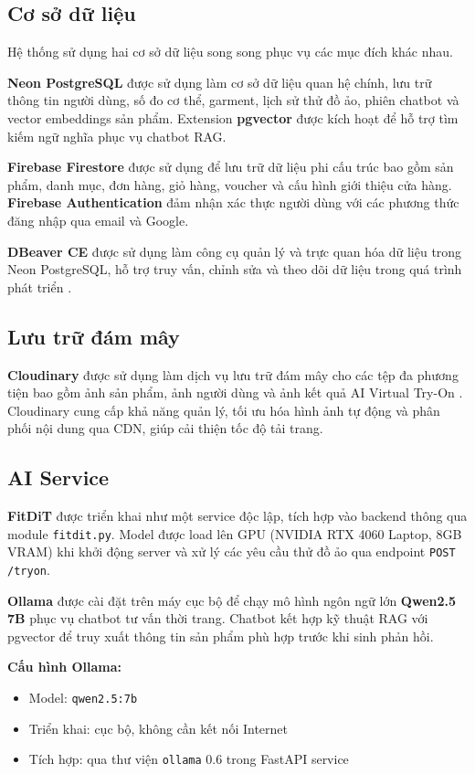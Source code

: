 \subsection{Cơ sở dữ liệu}
Hệ thống sử dụng hai cơ sở dữ liệu song song phục vụ các mục 
đích khác nhau.

\textbf{Neon PostgreSQL} được sử dụng làm cơ sở dữ liệu quan hệ 
chính, lưu trữ thông tin người dùng, số đo cơ thể, garment, 
lịch sử thử đồ ảo, phiên chatbot và vector embeddings sản phẩm. 
Extension \textbf{pgvector} được kích hoạt để hỗ trợ tìm kiếm 
ngữ nghĩa phục vụ chatbot RAG.

\textbf{Firebase Firestore} được sử dụng để lưu trữ dữ liệu 
phi cấu trúc bao gồm sản phẩm, danh mục, đơn hàng, giỏ hàng, 
voucher và cấu hình giới thiệu cửa hàng. \textbf{Firebase 
Authentication} đảm nhận xác thực người dùng với các phương thức 
đăng nhập qua email và Google.

\textbf{DBeaver CE} được sử dụng làm công cụ quản lý và trực 
quan hóa dữ liệu trong Neon PostgreSQL, hỗ trợ truy vấn, 
chỉnh sửa và theo dõi dữ liệu trong quá trình phát triển 
\cite{dbeaver_docs}.

\subsection{Lưu trữ đám mây}
\textbf{Cloudinary} được sử dụng làm dịch vụ lưu trữ đám mây 
cho các tệp đa phương tiện bao gồm ảnh sản phẩm, ảnh người dùng 
và ảnh kết quả AI Virtual Try-On \cite{cloudinary_docs}. 
Cloudinary cung cấp khả năng quản lý, tối ưu hóa hình ảnh 
tự động và phân phối nội dung qua CDN, giúp cải thiện tốc độ 
tải trang.

\subsection{AI Service}
\textbf{FitDiT} được triển khai như một service độc lập, tích 
hợp vào backend thông qua module \texttt{fitdit.py}. Model được 
load lên GPU (NVIDIA RTX 4060 Laptop, 8GB VRAM) khi khởi động 
server và xử lý các yêu cầu thử đồ ảo qua endpoint 
\texttt{POST /tryon}.

\textbf{Ollama} được cài đặt trên máy cục bộ để chạy mô hình 
ngôn ngữ lớn \textbf{Qwen2.5 7B} phục vụ chatbot tư vấn thời 
trang. Chatbot kết hợp kỹ thuật RAG với pgvector để truy xuất 
thông tin sản phẩm phù hợp trước khi sinh phản hồi.

\textbf{Cấu hình Ollama:}
\begin{itemize}[noitemsep]
    \item Model: \texttt{qwen2.5:7b}
    \item Triển khai: cục bộ, không cần kết nối Internet
    \item Tích hợp: qua thư viện \texttt{ollama} 0.6 trong 
    FastAPI service
\end{itemize}

